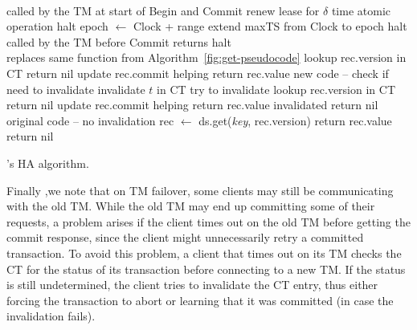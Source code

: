 \begin{algorithm}[tb]
\begin{algorithmic}[1]
\begin{small}
 \\
 \Comment called by the TM at start of {\sc Begin} and {\sc Commit} 
 \label{l:lease-start}
 \State renew lease for $\delta$ time \Comment atomic operation
  halt \EndIf 
\EndIf  \label{l:lease-end}
  \label{l:epoch-start}
\State epoch $\leftarrow$ Clock +  range
\State extend maxTS  from Clock  to epoch 
 halt \EndIf 
\EndIf  \label{l:epoch-end}
\EndProcedure
%
\Statex
{} \\
 \Comment called by the TM before {\sc Commit} returns
  halt \EndIf 
\EndIf
\EndProcedure
\Statex
%
 \\
\Comment replaces same function from Algorithm~\ref{fig:get-pseudocode}
 \State lookup rec.version in CT
       return nil \EndIf 	\label{l:invalidate-present}
       \State update rec.commit \Comment helping
         return rec.value \EndIf
\Else
\Comment new code -- check if need to invalidate
 \label{l:invalidate-start}
 \State invalidate $t$ in CT \Comment  try to invalidate
	\State lookup rec.version in CT
	 return nil \EndIf
       \State update rec.commit \Comment helping
          \State return rec.value \EndIf
\Else \Comment invalidated
	\State return nil
\EndIf \label{l:invalidate-end}
\Else \Comment original code -- no invalidation
         \State  rec $ \leftarrow$ ds.get(\emph{key}, rec.version)
		\State return rec.value \EndIf %
\EndIf
\EndIf
\State return nil
\EndProcedure
\end{small}
\end{algorithmic}
\caption{\sys's HA algorithm.}
\label{alg:ha}
\end{algorithm}

Finally ,we note that on TM failover, some clients may still
 be communicating with the old TM. While the old TM may
end up committing some of their requests, a problem arises
if the client times out on the old TM before getting the
commit response, since the client might unnecessarily retry a committed transaction. 
To avoid this problem, a client that times out on its TM checks the CT for the status of its transaction
before connecting to a new TM. If the status is still undetermined, the client tries to invalidate the  CT entry, thus either forcing the
transaction to abort or learning that it was committed (in case the invalidation fails). 

